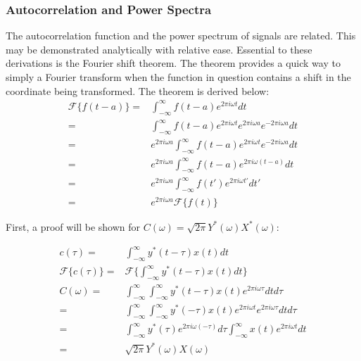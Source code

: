\documentclass[twocolumn]{article}
\begin{document}
\subsubsection{Autocorrelation and Power Spectra}
The autocorrelation function and the power spectrum of signals are related. This may be demonstrated analytically with relative ease. Essential to these derivations is the Fourier shift theorem. The theorem provides a quick way to simply a Fourier transform when the function in question contains a shift in the coordinate being transformed. The theorem is derived below:
\begin{equation}
\begin{split}
\mathcal{F} \{f(t - a)\} = & \int_{-\infty}^{\infty} f(t-a) e^{2\pi i\omega t} dt \\
= & \int_{-\infty}^{\infty} f(t-a) e^{2\pi i\omega t} e^{2\pi i\omega a} e^{-2\pi i\omega a} dt \\
= & e^{2\pi i\omega a} \int_{-\infty}^{\infty} f(t-a) e^{2\pi i\omega t}  e^{-2\pi i\omega a} dt \\
= & e^{2\pi i\omega a} \int_{-\infty}^{\infty} f(t-a) e^{2\pi i\omega (t - a)} dt \\
= & e^{2\pi i\omega a} \int_{-\infty}^{\infty} f(t') e^{2\pi i\omega t'} dt' \\
= & e^{2\pi i\omega a} \mathcal{F} \{f(t)\}
\end{split}
\end{equation}

First, a proof will be shown for $C(\omega) = \sqrt{2\pi} Y^*(\omega)X^*(\omega)$:

\begin{equation}
\begin{split}
c(\tau) = & \int_{-\infty}^{\infty} y^*(t - \tau) x(t) dt\\
\mathcal{F} \{c(\tau)\} = & \mathcal{F} \{\int_{-\infty}^{\infty} y^*(t - \tau) x(t) dt\} \\
C(\omega) = & \int_{-\infty}^{\infty} \int_{-\infty}^{\infty} y^*(t - \tau) x(t) e^{2\pi i \omega \tau} dt d\tau \\
= & \int_{-\infty}^{\infty} \int_{-\infty}^{\infty} y^*(-\tau) x(t) e^{2\pi i \omega t} e^{2\pi i \omega \tau} dt d\tau \\
= & \int_{-\infty}^{\infty}y^*(\tau) e^{2\pi i \omega (-\tau)}  d\tau \int_{-\infty}^{\infty}  x(t)  e^{2\pi i \omega t} dt \\
= &\sqrt{2\pi} Y^*(\omega)X(\omega)
\end{split}
\end{equation}
\end{document}
